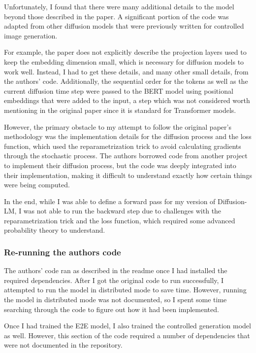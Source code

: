 Unfortunately, I found that there were many additional details to the model beyond those described in the paper. A significant portion of the code was adapted from other diffusion models that were previously written for controlled image generation.

For example, the paper does not explicitly describe the projection layers used to keep the embedding dimension small, which is necessary for diffusion models to work well. Instead, I had to get these details, and many other small details, from the authors' code. Additionally, the sequential order for the tokens as well as the current diffusion time step were passed to the BERT model using positional embeddings that were added to the input, a step which was not considered worth mentioning in the original paper since it is standard for Transformer models.

However, the primary obstacle to my attempt to follow the original paper's methodology was the implementation details for the diffusion process and the loss function, which used the reparametrization trick to avoid calculating gradients through the stochastic process. The authors borrowed code from another project to implement their diffusion process, but the code was deeply integrated into their implementation, making it difficult to understand exactly how certain things were being computed.

In the end, while I was able to define a forward pass for my version of Diffusion-LM, I was not able to run the backward step due to challenges with the reparametrization trick and the loss function, which required some advanced probability theory to understand.

\subsubsection{Re-running the authors code}

The authors' code ran as described in the readme once I had installed the required dependencies. After I got the original code to run successfully, I attempted to run the model in distributed mode to save time. However, running the model in distributed mode was not documented, so I spent some time searching through the code to figure out how it had been implemented.

Once I had trained the E2E model, I also trained the controlled generation model as well. However, this section of the code required a number of dependencies that were not documented in the repository.

